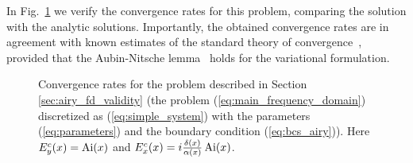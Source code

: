 In Fig.~\ref{fig:conv_rate} we verify the convergence rates for this problem, comparing the solution with the analytic solutions. 
Importantly, the obtained convergence rates are in agreement with known estimates of the standard theory of convergence~\cite[Chapter 5.7,
Chapter 0.4]{brenner}, provided that the Aubin-Nitsche lemma~\cite[Theorems 3.2.4, 3.2.5]{ciarlet_fem} holds for the variational formulation.  
\begin{figure}
    \caption{Convergence rates for the problem described in Section \ref{sec:airy_fd_validity} (the problem (\ref{eq:main_frequency_domain}) discretized as (\ref{eq:simple_system})
    with the parameters (\ref{eq:parameters}) and the boundary condition (\ref{eq:bcs_airy})). Here $E_{y}^{c}(x)=\operatorname{Ai}(x)$ and 
    $E_{x}^{c}(x)=i\frac{\delta(x)}{\alpha(x)}\operatorname{Ai}(x)$.}
    \label{fig:conv_rate}
\end{figure}

